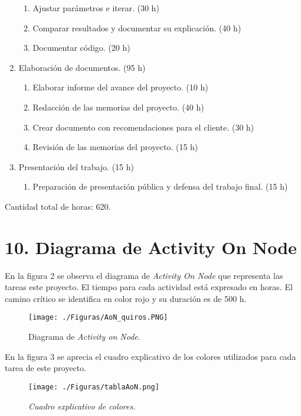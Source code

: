 \documentclass[
11pt, %
]{charter}
\begin{document}
\begin{enumerate}
\begin{enumerate}
	\item Ajustar parámetros e iterar. (30 h)
	\item Comparar resultados y documentar su explicación. (40 h)
	\item Documentar código. (20 h)
	\end{enumerate}
\item Elaboración de documentos. (95 h)
	\begin{enumerate}
	\item Elaborar informe del avance del proyecto. (10 h)
	\item Redacción de las memorias del proyecto. (40 h)
	\item Crear documento con recomendaciones para el cliente. (30 h)
	\item Revisión de las memorias del proyecto. (15 h)
	\end{enumerate}
\item Presentación del trabajo. (15 h)
  \begin{enumerate}
  \item Preparación de presentación pública y defensa del trabajo final. (15 h) 
  \end{enumerate}
\end{enumerate}

Cantidad total de horas: 620.


\section{10. Diagrama de Activity On Node}
\label{sec:AoN}
En la figura 2 se observa el diagrama de \textit{Activity On Node} que representa las tareas este proyecto. El tiempo para cada 
actividad está expresado en horas. El camino crítico se identifica en color rojo y su duración es de 500 h.

\begin{figure}[htpb]
\centering 
\texttt{[image: ./Figuras/AoN\_quiros.PNG]}
\caption{Diagrama de \textit{Activity on Node}.}
\label{fig:AoN}
\end{figure}
\pagebreak

En la figura 3 se aprecia el cuadro explicativo de los colores utilizados para cada tarea de este proyecto.
\begin{figure}[htpb]
  \centering 
  \texttt{[image: ./Figuras/tablaAoN.png]}
  \caption{\textit{Cuadro explicativo de colores}.}
  \label{fig:tablaAoN}
\end{figure}
\end{document}
